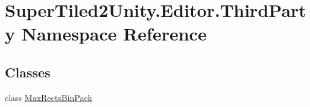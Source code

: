 \hypertarget{namespace_super_tiled2_unity_1_1_editor_1_1_third_party}{}\section{Super\+Tiled2\+Unity.\+Editor.\+Third\+Party Namespace Reference}
\label{namespace_super_tiled2_unity_1_1_editor_1_1_third_party}
\subsection*{Classes}
\begin{DoxyCompactItemize}
\item 
class \mbox{\hyperlink{class_super_tiled2_unity_1_1_editor_1_1_third_party_1_1_max_rects_bin_pack}{Max\+Rects\+Bin\+Pack}}
\end{DoxyCompactItemize}
